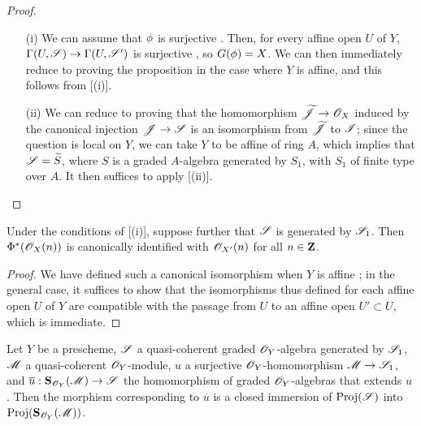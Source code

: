 \begin{proof}
\medskip\noindent
\begin{enumerate}
  \item[(i)] We can assume that $\phi$ is surjective .
    Then, for every affine open $U$ of $Y$, $\Gamma(U,\sh{S})\to\Gamma(U,\sh{S}')$ is surjective , so  $G(\phi)=X$.
    We can then immediately reduce to proving the proposition in the case where $Y$ is affine, and this follows from [(i)].
  \item[(ii)] We can reduce to proving that the homomorphism $\widetilde{\sh{J}}\to\sh{O}_X$ induced by the canonical injection $\sh{J}\to\sh{S}$ is an isomorphism from $\widetilde{\mathscr{J}}$ to $\mathscr{I}$;
    since the question is local on $Y$, we can take $Y$ to be affine of ring $A$, which implies that $\mathscr{S}=\widetilde{S}$, where $S$ is a graded $A$-algebra generated by $S_1$, with $S_1$ of finite type over $A$.
    It then suffices to apply [(ii)].
\end{enumerate}
\end{proof}

\begin{corollary}[3.6.3]
\label{II.3.6.3}
Under the conditions of [(i)], suppose further that $\mathscr{S}$ is generated by $\mathscr{S}_1$.
Then $\Phi^*(\mathscr{O}_X(n))$ is canonically identified with $\mathscr{O}_{X'}(n)$ for all $n\in\mathbf{Z}$.
\end{corollary}

\begin{proof}
We have defined such a canonical isomorphism when $Y$ is affine ;
in the general case, it suffices to show that the isomorphisms thus defined for each affine open $U$ of $Y$ are compatible with the passage from $U$ to an affine open $U'\subset U$, which is immediate.
\end{proof}

\begin{corollary}[3.6.4]
\label{II.3.6.4}
Let $Y$ be a prescheme, $\mathscr{S}$ a quasi-coherent graded $\mathscr{O}_Y$-algebra generated by $\mathscr{S}_1$, $\mathscr{M}$ a quasi-coherent $\mathscr{O}_Y$-module, $u$ a surjective $\mathscr{O}_Y$-homomorphism $\sh{M}\to\sh{S}_1$, and $\overline{u}:\bb{S}_{\sh{O}_Y}(\sh{M})\to\sh{S}$ the homomorphism of graded $\mathscr{O}_Y$-algebras that extends $u$ .
Then the morphism corresponding to $\overline{u}$ is a closed immersion of $\operatorname{Proj}(\mathscr{S})$ into $\operatorname{Proj}(\mathbf{S}_{\mathscr{O}_Y}(\mathscr{M}))$.
\end{corollary}

